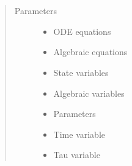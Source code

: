 \documentclass[letterpaper,10pt,english]{sphinxmanual}
\begin{document}
\begin{fulllineitems}
\label{\detokenize{yaocptool.modelling:yaocptool.modelling.dae_system.DAESystem}}~

\begin{fulllineitems}
\label{\detokenize{yaocptool.modelling:yaocptool.modelling.dae_system.DAESystem.__init__}}~\begin{quote}\begin{description}
\item[{Parameters}] \leavevmode\begin{itemize}
\item {} 
 \textendash{} ODE equations

\item {} 
 \textendash{} Algebraic equations

\item {} 
 \textendash{} State variables

\item {} 
 \textendash{} Algebraic variables

\item {} 
 \textendash{} Parameters

\item {} 
 \textendash{} Time variable

\item {} 
 \textendash{} Tau variable

\end{itemize}

\end{description}\end{quote}

\end{fulllineitems}


\begin{fulllineitems}
\label{\detokenize{yaocptool.modelling:yaocptool.modelling.dae_system.DAESystem.convert_from_tau_to_time}}
\end{fulllineitems}


\end{fulllineitems}
\end{document}
